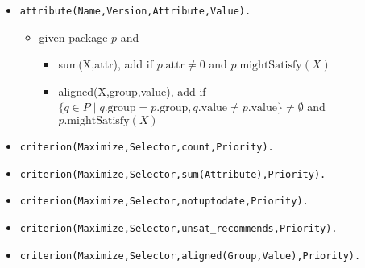\documentclass[a4paper,english]{article}
\begin{document}
\begin{itemize}
\begin{itemize}
    \end{itemize}
  \item \texttt{attribute(Name,Version,Attribute,Value).}
    \begin{itemize}
      \item given package $p$ and
        \begin{itemize}
          \item sum(X,attr), add if $p.\mathrm{attr}\not=0$ and $p.\mathrm{mightSatisfy}(X)$
          \item aligned(X,group,value), add if $\{q\in P \mid q.\mathrm{group} = p.\mathrm{group}, q.\mathrm{value} \neq p.\mathrm{value}\}\not=\emptyset$ and $p.\mathrm{mightSatisfy}(X)$
        \end{itemize}
    \end{itemize}
  \item \texttt{criterion(Maximize,Selector,count,Priority).}
  \item \texttt{criterion(Maximize,Selector,sum(Attribute),Priority).}
  \item \texttt{criterion(Maximize,Selector,notuptodate,Priority).}
  \item \texttt{criterion(Maximize,Selector,unsat\_recommends,Priority).}
  \item \texttt{criterion(Maximize,Selector,aligned(Group,Value),Priority).}
\end{itemize}
\end{document}
